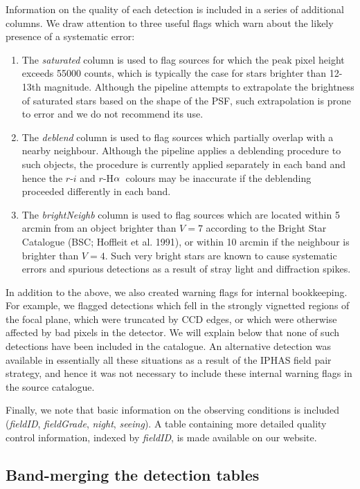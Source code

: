 \documentclass[useAMS,usenatbib]{mn2e}
\def\ha{\mbox{H$\rm \alpha$}}
\begin{document}
Information on the quality of each detection is included 
in a series of additional columns.
We draw attention to three useful flags
which warn about the likely presence of a systematic error:
\begin{enumerate}
\item The \emph{saturated} column is used to flag sources
for which the peak pixel height exceeds 55000 counts,
which is typically the case for stars brighter than 12-13th magnitude.
Although the pipeline attempts to extrapolate the brightness of
saturated stars based on the shape of the PSF,
such extrapolation is prone to error
and we do not recommend its use.
\item The \emph{deblend} column is used to flag sources 
which partially overlap with a nearby neighbour.
Although the pipeline applies a deblending procedure
to such objects, the procedure is currently applied separately
in each band and hence the $r$-$i$ and $r$-\ha\ colours
may be inaccurate if the deblending proceeded differently in each band.
\item The \emph{brightNeighb} column is used to flag sources which are located
within 5 arcmin from an object brighter than $V=7$ 
according to the Bright Star Catalogue (BSC; Hoffleit et al. 1991), 
or within 10 arcmin if the neighbour is brighter than $V=4$.
Such very bright stars are known to cause systematic errors
and spurious detections as a result of stray light 
and diffraction spikes.
\end{enumerate}
In addition to the above, we also created warning flags for internal bookkeeping.
For example, we flagged detections which fell in the strongly vignetted regions of the focal plane,
which were truncated by CCD edges,
or which were otherwise affected by bad pixels in the detector.
We will explain below that none of such detections 
have been included in the catalogue.
An alternative detection was available in essentially all these situations
as a result of the IPHAS field pair strategy,
and hence it was not necessary to include these internal warning flags
in the source catalogue.

Finally, we note that basic information on the observing conditions
is included (\emph{fieldID}, \emph{fieldGrade}, \emph{night}, \emph{seeing}).
A table containing more detailed quality control information,
indexed by \emph{fieldID}, is made available on our website.

\subsection{Band-merging the detection tables}
\end{document}
